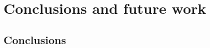\chapter{Conclusions and future work}
\label{ch:ConclusionsAndFutureWork}

\section{Conclusions}
\label{sec:Conclusions}






